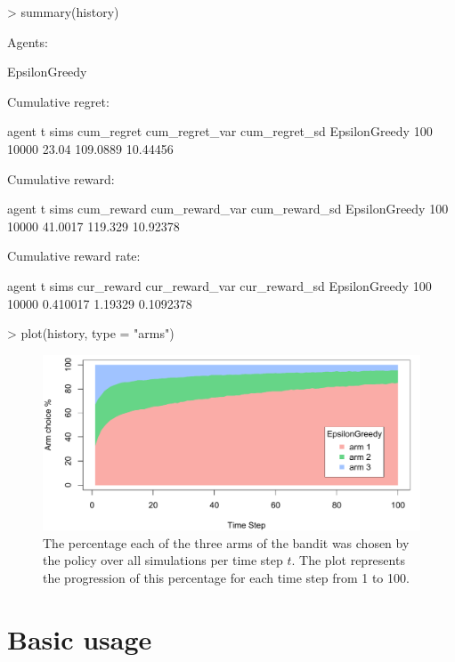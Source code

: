 \documentclass{jss}
\begin{document}
\begin{CodeChunk}
\begin{CodeInput}
> summary(history)
\end{CodeInput}
\begin{CodeOutput}
Agents:

  EpsilonGreedy

Cumulative regret:

         agent   t  sims cum_regret cum_regret_var cum_regret_sd
 EpsilonGreedy 100 10000      23.04       109.0889      10.44456


Cumulative reward:

         agent   t  sims cum_reward cum_reward_var cum_reward_sd
 EpsilonGreedy 100 10000    41.0017        119.329      10.92378


Cumulative reward rate:

         agent   t  sims cur_reward cur_reward_var cur_reward_sd
 EpsilonGreedy 100 10000   0.410017        1.19329     0.1092378
\end{CodeOutput}
\end{CodeChunk}

\begin{CodeChunk}
\begin{CodeInput}
> plot(history, type = "arms")
\end{CodeInput}
\end{CodeChunk}
\begin{figure}[H]
\centering
\includegraphics[width=.99\textwidth]{fig/section_2_3}
\caption{The percentage each of the three arms of the bandit was chosen by the policy over all simulations per time step $t$. The plot represents the progression of this percentage for each time step from 1 to 100.}
\label{fig:section_2_3}
\end{figure}


\section{Basic usage} \label{basicusage}
\end{document}
